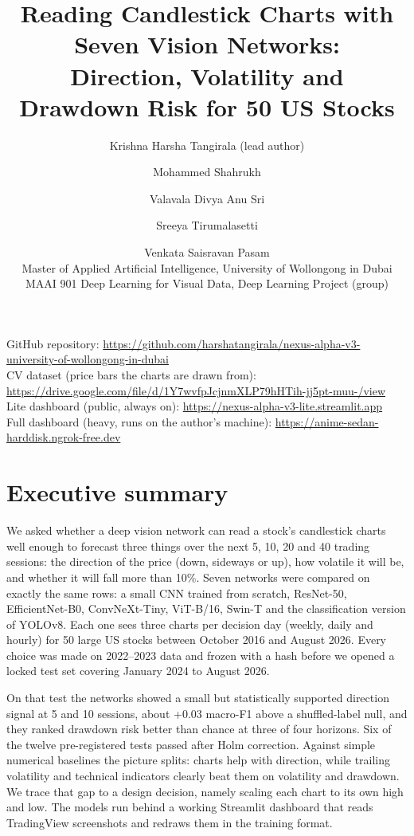 \documentclass[11pt,a4paper]{article}
\title{Reading Candlestick Charts with Seven Vision Networks:\\ Direction, Volatility and Drawdown Risk for 50 US Stocks}
\author{Krishna Harsha Tangirala (lead author) \and Mohammed Shahrukh \and Valavala Divya Anu Sri \and Sreeya Tirumalasetti \and Venkata Saisravan Pasam\\[2pt]
\small Master of Applied Artificial Intelligence, University of Wollongong in Dubai\\
\small MAAI 901 Deep Learning for Visual Data, Deep Learning Project (group)}
\date{}
\begin{document}
\maketitle

\begin{center}
\small
GitHub repository: \url{https://github.com/harshatangirala/nexus-alpha-v3-university-of-wollongong-in-dubai}\\
CV dataset (price bars the charts are drawn from): \url{https://drive.google.com/file/d/1Y7wvfpJcjnmXLP79hHTih-jj5pt-muu-/view}\\
Lite dashboard (public, always on): \url{https://nexus-alpha-v3-lite.streamlit.app}\\
Full dashboard (heavy, runs on the author's machine): \url{https://anime-sedan-harddisk.ngrok-free.dev}
\end{center}

\section{Executive summary}

We asked whether a deep vision network can read a stock's candlestick charts well enough to forecast three things over the next 5, 10, 20 and 40 trading sessions: the direction of the price (down, sideways or up), how volatile it will be, and whether it will fall more than 10\%. Seven networks were compared on exactly the same rows: a small CNN trained from scratch, ResNet-50, EfficientNet-B0, ConvNeXt-Tiny, ViT-B/16, Swin-T and the classification version of YOLOv8. Each one sees three charts per decision day (weekly, daily and hourly) for 50 large US stocks between October 2016 and August 2026. Every choice was made on 2022--2023 data and frozen with a hash before we opened a locked test set covering January 2024 to August 2026.

On that test the networks showed a small but statistically supported direction signal at 5 and 10 sessions, about +0.03 macro-F1 above a shuffled-label null, and they ranked drawdown risk better than chance at three of four horizons. Six of the twelve pre-registered tests passed after Holm correction. Against simple numerical baselines the picture splits: charts help with direction, while trailing volatility and technical indicators clearly beat them on volatility and drawdown. We trace that gap to a design decision, namely scaling each chart to its own high and low. The models run behind a working Streamlit dashboard that reads TradingView screenshots and redraws them in the training format.
\end{document}

